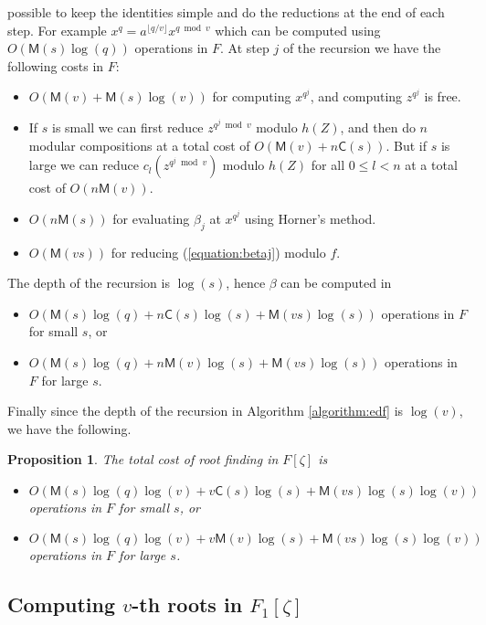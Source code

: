 \documentclass[12pt]{article}
\theoremstyle{plain}
\newtheorem{proposition}[theorem]{Proposition}
\theoremstyle{definition}
\def\MM{\ensuremath{\mathsf{M}}}
\def\CC{\ensuremath{\mathsf{C}}}
\newcounter{algorithm}
\begin{document}
possible to keep the identities simple and do the reductions at the end of each step. For example 
$x^q = a^{\lfloor q / v\rfloor}x^{q \bmod v}$ which can be computed using $O(\MM(s)\log(q))$
operations in $F$. At step $j$ of the recursion we have the following costs in $F$:
\begin{itemize}
	\item $O(\MM(v) + \MM(s)\log(v))$ for computing $x^{q^j}$, and computing $z^{q^j}$ is free.
	\item If $s$ is small we can first reduce $z^{q^j \bmod v}$ modulo $h(Z)$, and then do $n$ 
	modular compositions at a total cost
	of $O(\MM(v) + n\CC(s))$. But if $s$ is large we can reduce $c_l(z^{q^j \bmod v})$ modulo 
	$h(Z)$ for all $0 \le l < n$ at a total cost of $O(n\MM(v))$.
	\item $O(n\MM(s))$ for evaluating $\beta_j$ at $x^{q^j}$ using Horner's method.
	\item $O(\MM(vs))$ for reducing (\ref{equation:betaj}) modulo $f$.
\end{itemize}
The depth of the recursion is $\log(s)$, hence $\beta$ can be computed in
\begin{itemize}
	\item $O(\MM(s)\log(q) + n\CC(s)\log(s) + \MM(vs)\log(s))$ operations in $F$ for small 
	$s$, or
	\item $O(\MM(s)\log(q) + n\MM(v)\log(s) + \MM(vs)\log(s))$ operations in $F$ for large 
	$s$.
\end{itemize} 
Finally since the depth of the recursion in Algorithm \ref{algorithm:edf} is $\log(v)$, we have 
the following.
\begin{proposition}
	\label{proposition:root-fpz}
	The total cost of root finding in $F[\zeta]$ is
	\begin{itemize}
		\item $O(\MM(s)\log(q)\log(v) + v\CC(s)\log(s) + \MM(vs)\log(s)\log(v))$\\ operations 
		in $F$ for small $s$, or
		\item $O(\MM(s)\log(q)\log(v) + v\MM(v)\log(s) + \MM(vs)\log(s)\log(v))$\\ operations 
		in $F$ for large $s$.
	\end{itemize}
\end{proposition}






\subsection{Computing $v$-th roots in $F_1[\zeta]$}
\end{document}
